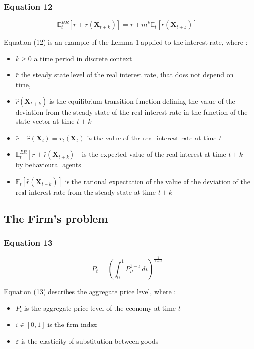 \documentclass{article}
\begin{document}
\subsubsection*{Equation 12}

\begin{equation}\tag{12}
    \mathbb{E}_{t}^{BR}\left[\bar{r}+\hat{r}\left(\bm{X}_{t+k}\right)\right]=\bar{r}+\bar{m}^{k}\mathbb{E}_{t}\left[\hat{r}(\bm{X}_{t+k})\right]
\end{equation}

Equation (12) is an example of the Lemma 1 applied to the interest rate, where :
\begin{itemize}
    \item $k\geq 0$ a time period in discrete context
    \item $\bar{r}$ the steady state level of the real interest rate, that does not depend on time,  
    \item $\hat{r}(\bm{X}_{t+k})$ is the equilibrium transition function defining the value of the deviation from the steady state of the real interest rate in the function of the state vector at time $t+k$
    \item $\bar{r}+\hat{r}(\bm{X}_{t})=r_{t}(\bm{X}_{t})$ is the value of the real interest rate at time $t$
    \item $\mathbb{E}_{t}^{BR}\left[\bar{r}+\hat{r}(\bm{X}_{t+k})\right]$ is the expected value of the real interest at time $t+k$ by behavioural agents
    \item $\mathbb{E}_{t}\left[\hat{r}(\bm{X}_{t+k})\right]$ is the rational expectation of the value of the deviation of the real interest rate from the steady state at time $t+k$
\end{itemize}

\subsection{The Firm's problem}

\subsubsection*{Equation 13}
\begin{equation}\tag{13}
    P_{t}=\left(\int_{0}^{1}P_{it}^{1-\varepsilon}\,di\right)^{\frac{1}{1-\varepsilon}}
\end{equation}

Equation (13) describes the aggregate price level, where : 
\begin{itemize}
    \item $P_{t}$ is the aggregate price level of the economy at time $t$
    \item $i\in\left[0,1\right]$ is the firm index
    \item $\varepsilon$ is the elasticity of substitution between goods
\end{itemize}
\end{document}
